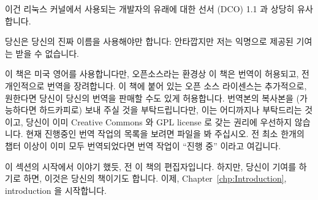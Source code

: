 이건 리눅스 커널에서 사용되는 개발자의 유래에 대한 선서 (DCO) 1.1 과
상당히 유사합니다.
\iffalse

This is quite similar to the Developer's Certificate of Origin (DCO)
1.1 used by the Linux kernel.
\fi

당신은 당신의 진짜 이름을 사용해야만 합니다: 안타깝지만 저는 익명으로 제공된
기여는 받을 수 없습니다.
\iffalse

You must use your real name:  I unfortunately cannot accept pseudonymous or
anonymous contributions.
\fi

이 책은 미국 영어를 사용합니다만, 오픈소스라는 환경상 이 책은 번역이 허용되고,
전 개인적으로 번역을 장려합니다.  이 책에 붙어 있는 오픈 소스 라이센스는
추가적으로, 원한다면 당신이 당신의 번역을 판매할 수도 있게 허용합니다.
번역본의 복사본을 (가능하다면 하드카피로) 보내 주실 것을 부탁드립니다만, 이는
어디까지나 부탁드리는 것이고, 당신이 이미 Creative Commons 와 GPL license 로
갖는 권리에 우선하지 않습니다.  현재 진행중인 번역 작업의 목록을 보려면
 파일을 봐 주십시오.  전 최소 한개의 챕터 이상이 이미 모두
번역되었다면 번역 작업이 ``진행 중'' 이라고 여깁니다.

\iffalse
The language of this book is American English, however, the open-source
nature of this book permits translations, and I personally encourage them.
The open-source licenses covering this book additionally allow you
to sell your translation, if you wish.
I do request that you send me a copy of the translation (hardcopy if
available), but this is a request made as a professional courtesy,
and is not in any way a prerequisite to the permission that you already
have under the Creative Commons and GPL licenses.
Please see the \co{FAQ.txt} file in the source tree for a list of
translations currently in progress.
I consider a translation effort to be ``in progress'' once at least one
chapter has been fully translated.
\fi

이 섹션의 시작에서 이야기 했듯, 전 이 책의 편집자입니다.
하지만, 당신이 기여를 하기로 하면, 이것은 당신의 책이기도 합니다.
이제, Chapter~\ref{chp:Introduction}, introduction 을 시작합니다.

\iffalse
As noted at the beginning of this section, I am this book's editor.
However, if you choose to contribute, it will be your book as well.
With that, I offer you Chapter~\ref{chp:Introduction}, our introduction.
\fi
